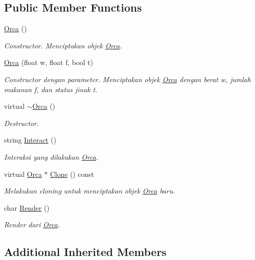 \subsection*{Public Member Functions}
\begin{DoxyCompactItemize}
\item 
\hyperlink{classOrca_a1efb2589b67f95863f7c8a653cfb13f3}{Orca} ()
\begin{DoxyCompactList}\small\item\em Constructor. Menciptakan objek \hyperlink{classOrca}{Orca}. \end{DoxyCompactList}\item 
\hyperlink{classOrca_aed38e6130ea0084cc65031262bbdf39a}{Orca} (float w, float f, bool t)
\begin{DoxyCompactList}\small\item\em Constructor dengan parameter. Menciptakan objek \hyperlink{classOrca}{Orca} dengan berat w, jumlah makanan f, dan status jinak t. \end{DoxyCompactList}\item 
virtual \hyperlink{classOrca_a964d6cd8b816cfa70f5194457b9382c0}{$\sim$\+Orca} ()
\begin{DoxyCompactList}\small\item\em Destructor. \end{DoxyCompactList}\item 
string \hyperlink{classOrca_adf95ca04578ac04aaa717ef2dd11bf4c}{Interact} ()
\begin{DoxyCompactList}\small\item\em Interaksi yang dilakukan \hyperlink{classOrca}{Orca}. \end{DoxyCompactList}\item 
virtual \hyperlink{classOrca}{Orca} $\ast$ \hyperlink{classOrca_ac44eb30486ba4051eefa914dc8cd670f}{Clone} () const 
\begin{DoxyCompactList}\small\item\em Melakukan cloning untuk menciptakan objek \hyperlink{classOrca}{Orca} baru. \end{DoxyCompactList}\item 
char \hyperlink{classOrca_a0673bfc8e70af67b463a4fcae224d9d5}{Render} ()
\begin{DoxyCompactList}\small\item\em Render dari \hyperlink{classOrca}{Orca}. \end{DoxyCompactList}\end{DoxyCompactItemize}
\subsection*{Additional Inherited Members}


